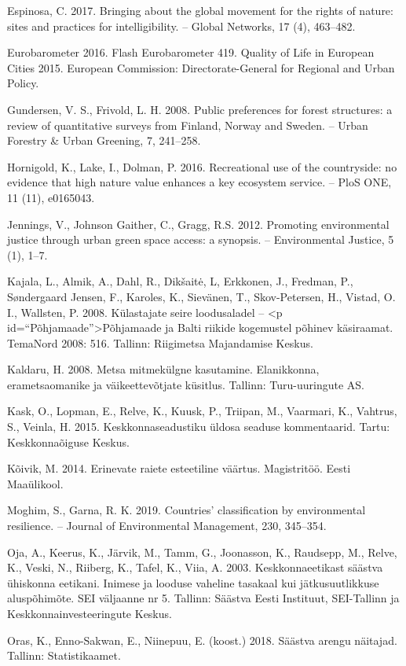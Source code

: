 \documentclass[estonian,]{article}
\begin{document}
Espinosa, C. 2017. Bringing about the global movement for the rights of nature: sites and practices for intelligibility. -- Global Networks, 17 (4), 463--482.

Eurobarometer 2016. Flash Eurobarometer 419. Quality of Life in European Cities 2015. European Commission: Directorate-General for Regional and Urban Policy.

Gundersen, V. S., Frivold, L. H. 2008. Public preferences for forest structures: a review of quantitative surveys from Finland, Norway and Sweden. -- Urban Forestry \& Urban Greening, 7, 241--258.

Hornigold, K., Lake, I., Dolman, P. 2016. Recreational use of the countryside: no evidence that high nature value enhances a key ecosystem service. -- PloS ONE, 11 (11), e0165043.

Jennings, V., Johnson Gaither, C., Gragg, R.S. 2012. Promoting environmental justice through urban green space access: a synopsis. -- Environmental Justice, 5 (1), 1--7.

Kajala, L., Almik, A., Dahl, R., Dikšaitė, L, Erkkonen, J., Fredman, P., Søndergaard Jensen, F., Karoles, K., Sievänen, T., Skov-Petersen, H., Vistad, O. I., Wallsten, P. 2008. Külastajate seire loodusaladel -- \textless{}p id=``Põhjamaade''\textgreater{}Põhjamaade ja Balti riikide kogemustel põhinev käsiraamat. TemaNord 2008: 516. Tallinn: Riigimetsa Majandamise Keskus.

Kaldaru, H. 2008. Metsa mitmekülgne kasutamine. Elanikkonna, erametsaomanike ja väikeettevõtjate küsitlus. Tallinn: Turu-uuringute AS.

Kask, O., Lopman, E., Relve, K., Kuusk, P., Triipan, M., Vaarmari, K., Vahtrus, S., Veinla, H. 2015. Keskkonnaseadustiku üldosa seaduse kommentaarid. Tartu: Keskkonnaõiguse Keskus.

Kõivik, M. 2014. Erinevate raiete esteetiline väärtus. Magistritöö. Eesti Maaülikool.

Moghim, S., Garna, R. K. 2019. Countries' classification by environmental resilience. -- Journal of Environmental Management, 230, 345--354.

Oja, A., Keerus, K., Järvik, M., Tamm, G., Joonasson, K., Raudsepp, M., Relve, K., Veski, N., Riiberg, K., Tafel, K., Viia, A. 2003. Keskkonnaeetikast säästva ühiskonna eetikani. Inimese ja looduse vaheline tasakaal kui jätkusuutlikkuse aluspõhimõte. SEI väljaanne nr 5. Tallinn: Säästva Eesti Instituut, SEI-Tallinn ja Keskkonnainvesteeringute Keskus.

Oras, K., Enno-Sakwan, E., Niinepuu, E. (koost.) 2018. Säästva arengu näitajad. Tallinn: Statistikaamet.
\end{document}
